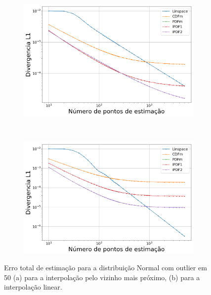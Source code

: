 \begin{figure}[H]
	\centering
	\begin{subfigure}[b]{0.45\textwidth}
		\centering 
		\includegraphics[width=\textwidth]{./figuras/ERRORPLOT_L1_TRUE_NORMAL_NEAREST_050_log}
		\caption{}
		\label{fig:error_norm_near_50}
	\end{subfigure}
	\hfill
	~ %
	\begin{subfigure}[b]{0.45\textwidth}
		\centering 
		\includegraphics[width=\textwidth]{./figuras/ERRORPLOT_L1_TRUE_NORMAL_LINEAR_050_log}
		\caption{}
		\label{fig:error_norm_lin_50}
	\end{subfigure}
\caption{Erro total de estimação para a distribuição Normal com outlier em 50 (a) para a interpolação pelo vizinho mais próximo, (b) para a interpolação linear.}
\label{fig:Error_out}
\end{figure}